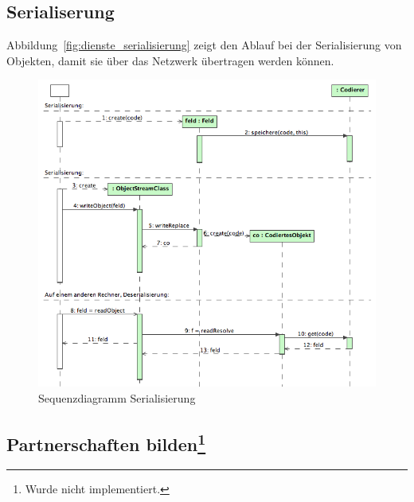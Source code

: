 \documentclass[12pt,halfparskip]{scrartcl}
\begin{document}
\clearpage
\subsection{Serialiserung}
\label{sub:serialiserung}
Abbildung~\vref{fig:dienste_serialisierung} zeigt den Ablauf bei der Serialisierung von Objekten, damit sie über das Netzwerk übertragen werden können.
\begin{figure}[h]
	\centering
	\includegraphics[width=\textwidth]{dienste_serialisierung}
	\caption{Sequenzdiagramm Serialisierung}
	\label{fig:dienste_serialisierung}
\end{figure}

\clearpage

\subsection[Partnerschaften bilden]{Partnerschaften bilden\footnote{Wurde nicht implementiert.}}
\label{sub:partnerschaften_bilden}
\end{document}
